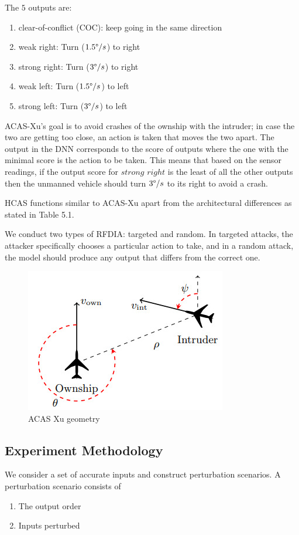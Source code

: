 The $5$ outputs are:
\begin{enumerate}
		\item clear-of-conflict (COC): keep going in the same direction
	\item weak right: Turn ($1.5\degree /s$) to right
	\item strong right:  Turn  ($3 \degree /s$) to right
	\item weak left: Turn ($1.5\degree /s$) to left
	\item strong left: Turn ($3 \degree /s$) to left
\end{enumerate}

\ac{ACAS-Xu}'s goal is to avoid crashes of the ownship with the intruder; in case the two are getting too close, an action is taken that moves the two apart. 
The output in the \ac{DNN} corresponds to the score of outputs where the one with the minimal score is the action to be taken. 
This means that based on the sensor readings, if the output score for $strong$ $right$ is the least of all the other outputs then the unmanned vehicle should turn $3 \degree /s$ to its right to avoid a crash. 

\ac{HCAS} functions similar to \ac{ACAS-Xu} apart from the architectural differences as stated in Table 5.1. 

We conduct two types of \ac{RFDIA}: targeted and random.
In targeted attacks, the attacker specifically chooses a particular action to take, and in a random attack, the model should produce any output that differs from the correct one. 

\begin{figure}
	\centering
	\includegraphics[width=0.7\linewidth]{Images/ACASXugeometry}
	\caption[ACAS Xu]{ACAS Xu geometry}
	\label{fig:acasxugeometry}
\end{figure}

\subsection{Experiment Methodology}
We consider a set of accurate inputs and construct perturbation scenarios. A perturbation scenario consists of 
\begin{enumerate}
	\item The output order
	\item Inputs perturbed
\end{enumerate}

